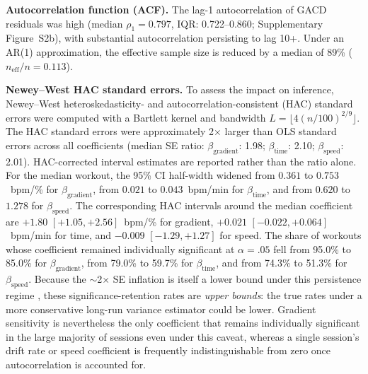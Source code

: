 \documentclass[times, twoside]{zHenriquesLab-StyleBioRxiv}
\begin{document}
\textbf{Autocorrelation function (ACF).} The lag-1 autocorrelation of GACD residuals was high (median $\rho_1 = 0.797$, IQR: 0.722--0.860; Supplementary Figure~S2b), with substantial autocorrelation persisting to lag 10+. Under an AR(1) approximation, the effective sample size is reduced by a median of 89\% ($n_{\text{eff}}/n = 0.113$).

\textbf{Newey--West HAC standard errors.} To assess the impact on inference, Newey--West heteroskedasticity- and autocorrelation-consistent (HAC) standard errors were computed with a Bartlett kernel and bandwidth $L = \lfloor 4(n/100)^{2/9} \rfloor$. The HAC standard errors were approximately 2$\times$ larger than OLS standard errors across all coefficients (median SE ratio: $\beta_{\text{gradient}}$: 1.98; $\beta_{\text{time}}$: 2.10; $\beta_{\text{speed}}$: 2.01). HAC-corrected interval estimates are reported rather than the ratio alone. For the median workout, the 95\% CI half-width widened from $0.361$ to $0.753$~bpm/\% for $\beta_{\text{gradient}}$, from $0.021$ to $0.043$~bpm/min for $\beta_{\text{time}}$, and from $0.620$ to $1.278$ for $\beta_{\text{speed}}$. The corresponding HAC intervals around the median coefficient are $+1.80$ $[+1.05, +2.56]$~bpm/\% for gradient, $+0.021$ $[-0.022, +0.064]$~bpm/min for time, and $-0.009$ $[-1.29, +1.27]$ for speed. The share of workouts whose coefficient remained individually significant at $\alpha = .05$ fell from 95.0\% to 85.0\% for $\beta_{\text{gradient}}$, from 79.0\% to 59.7\% for $\beta_{\text{time}}$, and from 74.3\% to 51.3\% for $\beta_{\text{speed}}$. Because the $\sim$2$\times$ SE inflation is itself a lower bound under this persistence regime \cite{lazarus2018}, these significance-retention rates are \textit{upper bounds}: the true rates under a more conservative long-run variance estimator could be lower. Gradient sensitivity is nevertheless the only coefficient that remains individually significant in the large majority of sessions even under this caveat, whereas a single session's drift rate or speed coefficient is frequently indistinguishable from zero once autocorrelation is accounted for.
\end{document}
